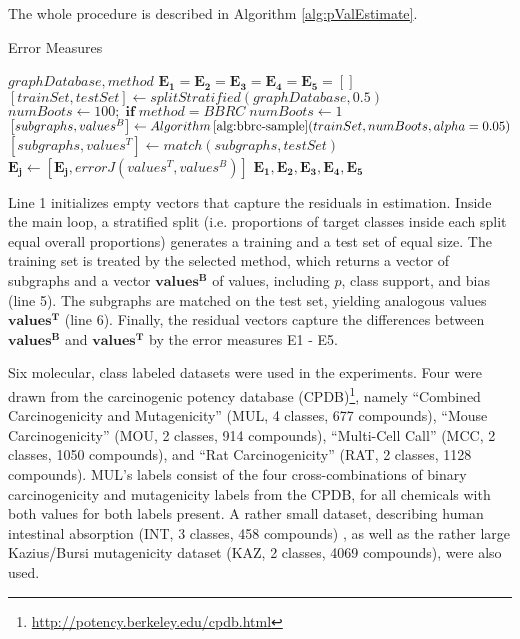 \documentclass{article}
\begin{document}
The whole procedure is described in Algorithm \ref{alg:pValEstimate}.
\begin{algorithm}[t]
  \caption{Error Measures}
  \label{alg:pValEstimate}
  {\small \begin{algorithmic}[1]
  \Require $graphDatabase, method$ 
  \State $\mathbf{E_1}=\mathbf{E_2}=\mathbf{E_3}=\mathbf{E_4}=\mathbf{E_5}=\left[ \right]$
    \State $[trainSet, testSet] \gets splitStratified(graphDatabase,0.5)$ 
    \State $numBoots \gets 100;\;\textbf{if}\; method=BBRC\; numBoots \gets 1$
    \State $\left[ subgraphs, values^B \right] \gets Algorithm\,\ref{alg:bbrc-sample}(trainSet,numBoots,alpha=0.05)$ 
    \State $\left[ subgraphs, values^T \right] \gets match(subgraphs, testSet)$ 
      \State $ \mathbf{E_j} \gets \left[ \mathbf{E_j}, errorJ(values^T, values^B) \right]$
    \EndFor
  \EndFor
  \Ensure $\mathbf{E_1},\mathbf{E_2},\mathbf{E_3},\mathbf{E_4},\mathbf{E_5}$
\end{algorithmic}}
\end{algorithm}

Line 1 initializes empty vectors that capture the residuals in estimation.
Inside the main loop, a stratified split (i.e. proportions of target classes
inside each split equal overall proportions) generates a training and a test
set of equal size. The training set is treated by the selected method, which
returns a vector of subgraphs and a vector $\mathbf{values^B}$ of values,
including $p$, class support, and bias (line 5). The subgraphs are matched on
the test set, yielding analogous values $\mathbf{values^T}$ (line 6). Finally, the
residual vectors capture the differences between $\mathbf{values^B}$ and
$\mathbf{values^T}$ by the error measures E1 - E5.

Six molecular, class labeled datasets were used in the experiments. 
Four were drawn from the carcinogenic potency database
(CPDB)\footnote{\url{http://potency.berkeley.edu/cpdb.html}}, namely 
``Combined Carcinogenicity and Mutagenicity'' (MUL, 4 classes, 677 compounds),
``Mouse Carcinogenicity'' (MOU, 2 classes, 914 compounds), 
``Multi-Cell Call'' (MCC, 2 classes, 1050 compounds), and 
``Rat Carcinogenicity'' (RAT, 2 classes, 1128 compounds). 
MUL's labels consist of the four cross-combinations of binary carcinogenicity
and mutagenicity labels from the CPDB, for all chemicals with both values for
both labels present.
A rather small dataset, describing human intestinal absorption (INT, 3 classes, 458 compounds) \cite{Suenderhauf10Combinatorial}, as well as
the rather large Kazius/Bursi mutagenicity dataset (KAZ, 2 classes, 4069 compounds), \cite{kazius05derivation} were also used.
\end{document}
